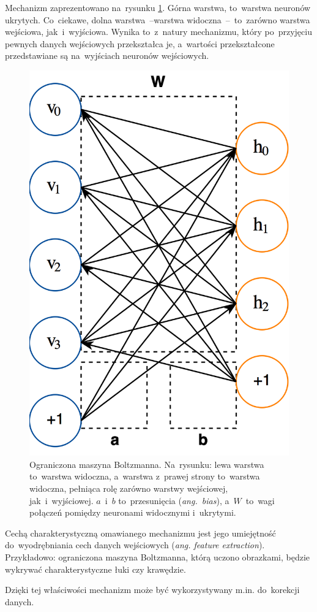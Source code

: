 Mechanizm zaprezentowano na~rysunku \ref{rys:restricted-boltzmann-machine}. Górna warstwa,
to~warstwa neuronów ukrytych. Co~ciekawe, dolna warstwa~--warstwa widoczna~--~to~zarówno warstwa wejściowa,
jak~i~wyjściowa. Wynika to~z~natury mechanizmu, który po~przyjęciu pewnych danych wejściowych przekształca je,
a~wartości przekształcone przedstawiane są na~wyjściach neuronów wejściowych.

\begin{figure}[H]
	\centering
	\includegraphics[width=0.65\linewidth]{img/RBM.png}
	\caption{Ograniczona maszyna Boltzmanna. Na~rysunku: lewa warstwa to~warstwa widoczna, a~warstwa z~prawej strony
	to~warstwa widoczna, pełniąca rolę zarówno warstwy wejściowej, jak~i~wyjściowej. $a$~i~$b$ to~przesunięcia
(\textit{ang.~bias}), a~$W$~to~wagi połączeń pomiędzy neuronami widocznymi i~ukrytymi.}
	\label{rys:restricted-boltzmann-machine}
\end{figure}

Cechą charakterystyczną omawianego mechanizmu jest jego umiejętność do~wyodrębniania cech danych wejściowych
(\textit{ang. feature extraction}). Przykładowo: ograniczona maszyna Boltzmanna, którą uczono obrazkami, będzie
wykrywać charakterystyczne łuki czy krawędzie.

Dzięki tej właściwości mechanizm może być wykorzystywany m.in. do~korekcji danych.

